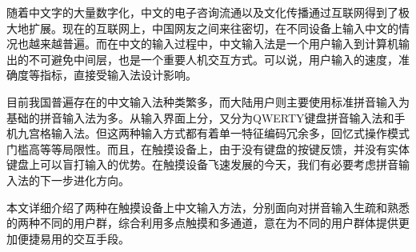 
  随着中文字的大量数字化，中文的电子咨询流通以及文化传播通过互联网得到了极大地扩展。现在的互联网上，中国网友之间来往密切，在不同设备上输入中文的情况也越来越普遍。而在中文的输入过程中，中文输入法是一个用户输入到计算机输出的不可避免中间层，也是一个重要人机交互方式。可以说，用户输入的速度，准确度等指标，直接受输入法设计影响。

  目前我国普遍存在的中文输入法种类繁多，而大陆用户则主要使用标准拼音输入为基础的拼音输入法为多。从输入界面上分，又分为QWERTY键盘拼音输入法和手机九宫格输入法。但这两种输入方式都有着单⼀特征编码冗余多，回忆式操作模式门槛⾼等等局限性。而且，在触摸设备上，由于没有键盘的按键反馈，并没有实体键盘上可以盲打输入的优势。在触摸设备飞速发展的今天，我们有必要考虑拼音输入法的下一步进化方向。

  本文详细介绍了两种在触摸设备上中文输入方法，分别面向对拼音输入生疏和熟悉的两种不同的用户群，综合利用多点触摸和多通道，意在为不同的用户群体提供更加便捷易用的交互手段。

